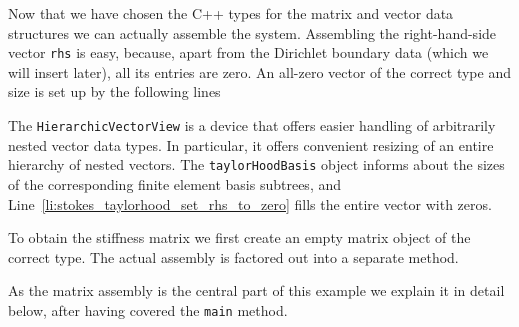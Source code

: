 \documentclass[a4paper,10pt,headings=normal,bibliography=totoc]{scrartcl}
\newcommand{\cpp}[1]{\lstinline[basicstyle=\ttfamily]!#1!}
\begin{document}
Now that we have chosen the C++ types for the matrix and vector data structures we can actually assemble the system.
Assembling the right-hand-side vector \cpp{rhs} is easy, because, apart from the Dirichlet boundary data (which we
will insert later), all its entries are zero.  An all-zero vector of the correct type and size is set up by the
following lines
%

%
The \cpp{HierarchicVectorView} is a device that offers easier handling of arbitrarily nested vector data types.
In particular, it offers convenient resizing of an entire hierarchy of nested vectors.
The \cpp{taylorHoodBasis} object informs about the sizes of the corresponding finite element basis subtrees,
and Line~\ref{li:stokes_taylorhood_set_rhs_to_zero} fills the entire vector with zeros.

To obtain the stiffness matrix we first create an empty matrix object of the correct type.  The actual assembly
is factored out into a separate method.
%

%
As the matrix assembly is the central part of this example we explain it in detail below, after having covered the \cpp{main} method.
\end{document}
